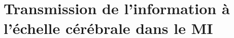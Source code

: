
\clearpage
\section{Transmission de l'information à l'échelle cérébrale dans le MI}
\label{transmissiondinfo}

